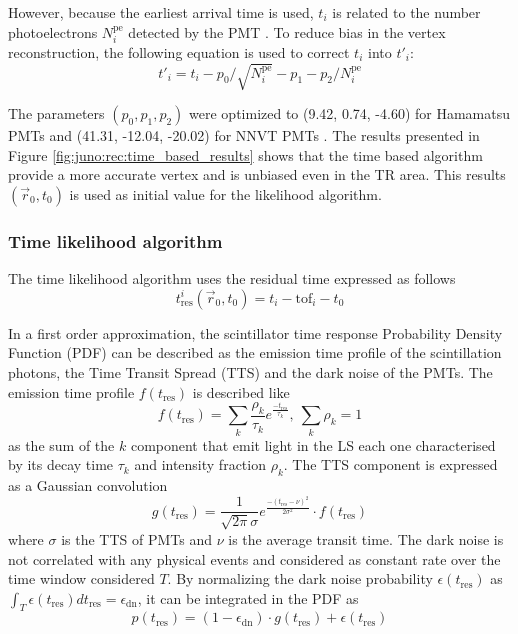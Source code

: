 \documentclass[../main.tex]{subfiles}
\begin{document}
However, because the earliest arrival time is used, $t_i$ is related to the number photoelectrons $N_i^{\mathrm{pe}}$ detected by the PMT \cite{ranucci_analytical_1995, galbiati_time_2006, moszynski_status_1979}. To reduce bias in the vertex reconstruction, the following equation is used to correct $t_i$ into $t'_i$:
\begin{equation}
  t'_{i} = t_i - p_0 / \sqrt{N_i^{\mathrm{pe}}} - p_1 - p_2 / N_i^{\mathrm{pe}}
\end{equation}

The parameters $(p_0, p_1, p_2)$ were optimized to (9.42, 0.74, -4.60) for Hamamatsu PMTs and (41.31, -12.04, -20.02) for NNVT PMTs \cite{li_event_2021}. The results presented in Figure \ref{fig:juno:rec:time_based_results} shows that the time based algorithm provide a more accurate vertex and is unbiased even in the TR area. This results $(\vec{r}_0, t_0)$ is used as initial value for the likelihood algorithm.

\subsubsection{Time likelihood algorithm}

The time likelihood algorithm uses the residual time expressed as follows
\begin{equation}
  \label{eq:juno:rec:t_res}
  t_{\mathrm{res}}^i(\vec{r}_0, t_0) = t_i - \mathrm{tof}_i - t_0
\end{equation}

In a first order approximation, the scintillator time response Probability Density Function (PDF) can be described as the emission time profile of the scintillation photons, the Time Transit Spread (TTS) and the dark noise of the PMTs. The emission time profile $f(t_{\mathrm{res}})$ is described like
\begin{equation}
  f(t_{\mathrm{res}}) = \sum_k \frac{\rho_k}{\tau_k} e^{\frac{-t_{\mathrm{res}}}{\tau_k}}, ~ \sum_k \rho_k = 1
\end{equation}
as the sum of the $k$ component that emit light in the LS each one characterised by its decay time $\tau_k$ and intensity fraction $\rho_k$. The TTS component is expressed as a Gaussian convolution
\begin{equation}
  g(t_{\mathrm{res}}) = \frac{1}{\sqrt{2\pi}\sigma}e^{\frac{-(t_{\mathrm{res}} - \nu)^2}{2\sigma^2}} \cdot f(t_{\mathrm{res}})
\end{equation}
where $\sigma$ is the TTS of PMTs and $\nu$ is the average transit time. The dark noise is not correlated with any physical events and considered as constant rate over the time window considered $T$. By normalizing the dark noise probability $\epsilon(t_{\mathrm{res}})$ as $\int_T \epsilon(t_{\mathrm{res}}) dt_{\mathrm{res}} = \epsilon_{\mathrm{dn}}$, it can be integrated in the PDF as
\begin{equation}
  \label{eq:juno:juno:tim_like:dn}
  p(t_{\mathrm{res}}) = (1-\epsilon_{\mathrm{dn}}) \cdot g(t_{\mathrm{res}}) + \epsilon(t_{\mathrm{res}})
\end{equation}
\end{document}
